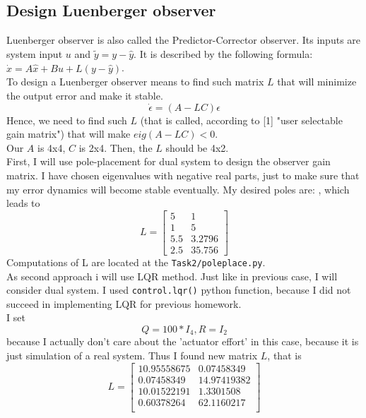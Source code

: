\documentclass[a4paper,12pt]{article}
\begin{document}
\subsection{Design Luenberger observer}
Luenberger observer is also called the Predictor-Corrector observer. Its inputs 
are system input $u$ and $\tilde{y} = y - \hat{y}$. It is described by the following
formula: $\hat {\dot x}=A \hat x + Bu + L(y - \hat y)$.\\
To design a Luenberger observer means to find such matrix $L$ that will minimize
the output error and make it stable. 
\begin{equation*}
    \dot \epsilon = (A - LC)\epsilon
\end{equation*} 
Hence, we need to find such $L$ (that is called, according to [1] "user selectable 
gain matrix") that will make $eig(A-LC) < 0$.\\
Our $A$ is 4x4, $C$ is 2x4. Then, the $L$ should be 4x2.\\
First, I will use pole-placement for dual system to design the observer gain matrix.
I have chosen eigenvalues with negative real parts, just to make sure that my 
error dynamics will become stable eventually. My desired poles are:
,
which leads to  
\begin{equation*}
    L =
    \begin{bmatrix}
        5 & 1\\
        1 & 5\\
        5.5 & 3.2796\\
        2.5 & 35.756
    \end{bmatrix}
\end{equation*}
Computations of L are located at the \texttt{Task2/poleplace.py}.\\
As second approach i will use LQR method. Just like in previous case, I will consider
dual system. I used \texttt{control.lqr()} python function, because I did not 
succeed in implementing LQR for previous homework.\\
I set
\begin{equation*}
    Q=100 * I_4, R=I_2
\end{equation*}
because I actually don't care about the 'actuator effort' in this case, because
it is just simulation of a real system. Thus I found new matrix $L$, that is
\begin{equation*}
    L=
    \begin{bmatrix}
        10.95558675  & 0.07458349\\
        0.07458349   & 14.97419382\\
        10.01522191  & 1.3301508 \\
        0.60378264   & 62.1160217 \\
    \end{bmatrix}
\end{equation*}
\end{document}
